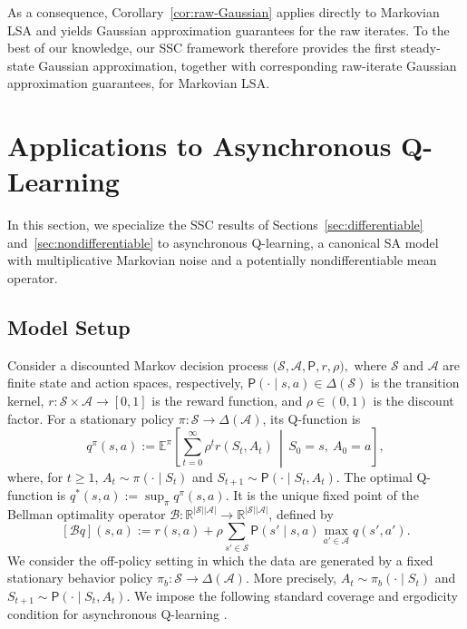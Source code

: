 \documentclass[11pt,letterpaper]{article}
\theoremstyle{plain}
\theoremstyle{definition}
\theoremstyle{remark}
\newcommand{\E}{\mathbb{E}}
\newcommand{\mS}{\mathcal{S}}
\newcommand{\mA}{\mathcal{A}}
\newcommand{\R}{\mathbb{R}}
\begin{document}
As a consequence, Corollary~\ref{cor:raw-Gaussian} applies directly to
Markovian LSA and yields Gaussian approximation guarantees for the raw
iterates. To the best of our knowledge, our SSC framework therefore provides
the first steady-state Gaussian approximation, together with corresponding
raw-iterate Gaussian approximation guarantees, for Markovian LSA.

\section{Applications to Asynchronous Q-Learning}
\label{sec:Q-learning}

In this section, we specialize the SSC results of
Sections~\ref{sec:differentiable} and~\ref{sec:nondifferentiable} to
asynchronous Q-learning, a canonical SA model with multiplicative Markovian
noise and a potentially nondifferentiable mean operator.

\subsection{Model Setup}
\label{sec:q-learning-model}


Consider a discounted Markov decision process $\bigl(\mS,\mA,\mathsf P,r,\rho\bigr),$ where \(\mS\) and \(\mA\) are finite state and action spaces,
respectively, $\mathsf P(\cdot\mid s,a)\in\Delta(\mS)$ is the transition kernel, $r:\mS\times\mA\to[0,1]$ is the reward function, and \(\rho\in(0,1)\) is the discount factor. For a stationary policy
\(\pi:\mS\to\Delta(\mA)\), its Q-function is
\[
    q^\pi(s,a)
    :=
    \E^\pi\left[
        \sum_{t=0}^{\infty}
        \rho^t r(S_t,A_t)
        \,\middle|\,
        S_0=s,\ A_0=a
    \right],
\]
where, for \(t\geq1\), $A_t\sim\pi(\cdot\mid S_t)$ and $S_{t+1}\sim\mathsf P(\cdot\mid S_t,A_t).$ The optimal Q-function is $q^*(s,a)
    :=
    \sup_{\pi}q^\pi(s,a).$ It is the unique fixed point of the Bellman optimality operator
\(\mathcal B:\R^{|\mS||\mA|}\to\R^{|\mS||\mA|}\), defined by
\begin{equation}
\label{eq:q-bellman-operator}
    [\mathcal B q](s,a)
    :=
    r(s,a)
    +
    \rho
    \sum_{s'\in\mS}
    \mathsf P(s'\mid s,a)
    \max_{a'\in\mA}q(s',a').
\end{equation}
We consider the off-policy setting in which the data are generated by a
fixed stationary behavior policy
\(\pi_b:\mS\to\Delta(\mA)\). More precisely, $A_t\sim\pi_b(\cdot\mid S_t)$ and $S_{t+1}\sim\mathsf P(\cdot\mid S_t,A_t).$ 
We impose the following standard coverage and ergodicity condition for
asynchronous Q-learning \cite{chen2024lyapunov}.
\end{document}
